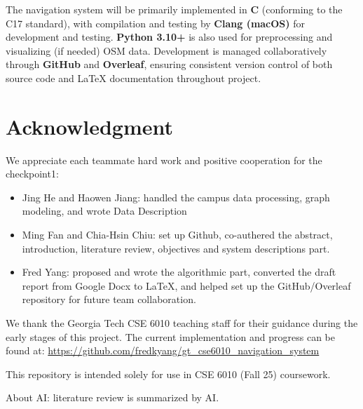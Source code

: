 \documentclass[fleqn,10pt]{olplainarticle}
\begin{document}
The navigation system will be primarily implemented in \textbf{C} (conforming to the C17 standard), with compilation and testing by \textbf{Clang (macOS)} for development and testing. \textbf{Python 3.10+} is also used for preprocessing and visualizing (if needed) OSM data. Development is managed collaboratively through \textbf{GitHub} and \textbf{Overleaf}, ensuring consistent version control of both source code and \LaTeX{} documentation throughout project.

\newpage
\section*{Acknowledgment}
We appreciate each teammate hard work and positive cooperation for the checkpoint1:
\begin{itemize}
    \item Jing He and Haowen Jiang: handled the campus data processing, graph modeling, and wrote Data Description
    \item Ming Fan and Chia-Hsin Chiu: set up Github, co-authered the abstract, introduction, literature review, objectives and system descriptions part.
    \item Fred Yang: proposed and wrote the algorithmic part, converted the draft report from Google Docx to \LaTeX{}, and helped set up the GitHub/Overleaf repository for future team collaboration.
\end{itemize}
We thank the Georgia Tech CSE 6010 teaching staff for their guidance during the early stages of this project.  
The current implementation and progress can be found at:  
\url{https://github.com/fredkyang/gt_cse6010_navigation_system}

This repository is intended solely for use in CSE 6010 (Fall 25) coursework.

About AI: literature review is summarized by AI.


\end{document}
